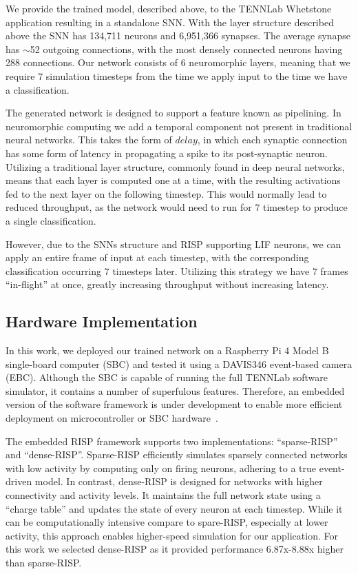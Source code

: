 \documentclass[conference]{IEEEtran}
\begin{document}
We provide the trained model, described above, to the TENNLab Whetstone application resulting in a standalone SNN. With the layer structure described above the SNN has 134,711 neurons and 6,951,366 synapses. The average synapse has $\sim$52 outgoing connections, with the most densely connected neurons having 288 connections. Our network consists of $6$ neuromorphic layers, meaning that we require 7 simulation timesteps from the time we apply input to the time we have a classification.

The generated network is designed to support a feature known as pipelining. In neuromorphic computing we add a temporal component not present in traditional neural networks. This takes the form of $delay$, in which each synaptic connection has some form of latency in propagating a spike to its post-synaptic neuron. Utilizing a traditional layer structure, commonly found in deep neural networks, means that each layer is computed one at a time, with the resulting activations fed to the next layer on the following timestep. This would normally lead to reduced throughput, as the network would need to run for $7$ timestep to produce a single classification.

However, due to the SNNs structure and RISP supporting LIF neurons, we can apply an entire frame of input at each timestep, with the corresponding classification occurring $7$ timesteps later. Utilizing this strategy we have $7$ frames ``in-flight'' at once, greatly increasing throughput without increasing latency.

\subsection{Hardware Implementation}
In this work, we deployed our trained network on a Raspberry Pi 4 Model B single-board computer (SBC) and tested it using a DAVIS346 event-based camera (EBC). Although the SBC is capable of running the full TENNLab software simulator, it contains a number of superfulous features. Therefore, an embedded version of the software framework is under development to enable more efficient deployment on microcontroller or SBC hardware~\cite{gullett}.

The embedded RISP framework supports two implementations: ``sparse-RISP'' and ``dense-RISP''. Sparse-RISP efficiently simulates sparsely connected networks with low activity by computing only on firing neurons, adhering to a true event-driven model. In contrast, dense-RISP is designed for networks with higher connectivity and activity levels. It maintains the full network state using a ``charge table'' and updates the state of every neuron at each timestep. While it can be computationally intensive compare to spare-RISP, especially at lower activity, this approach enables higher-speed simulation for our application. For this work we selected dense-RISP as it provided performance 6.87x-8.88x higher than sparse-RISP.
\end{document}
